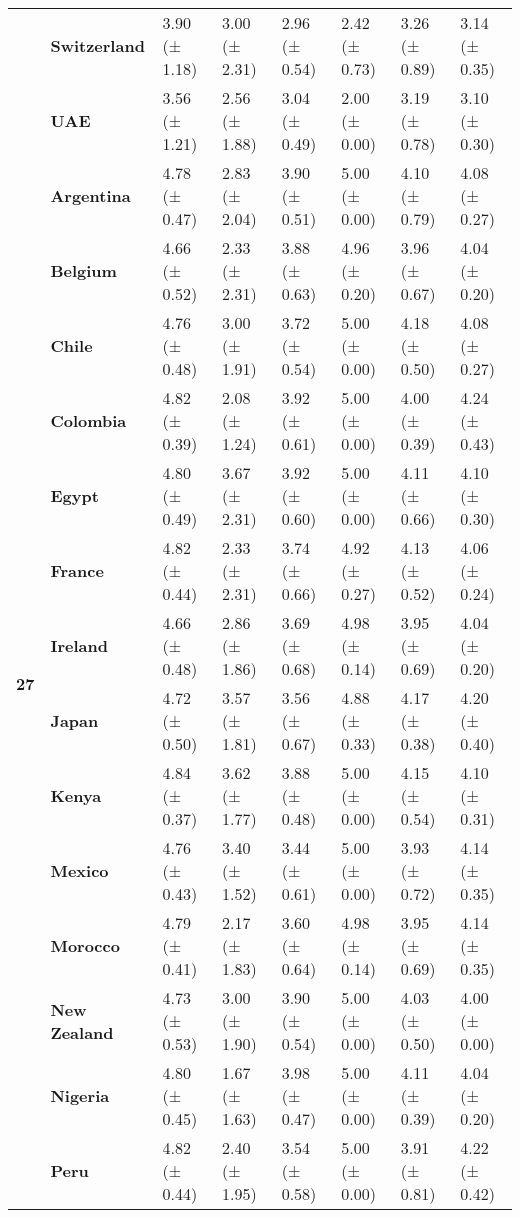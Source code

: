 \begin{longtable}{llllllll}
\textbf{} & \textbf{Switzerland} & 3.90 (± 1.18) & 3.00 (± 2.31) & 2.96 (± 0.54) & 2.42 (± 0.73) & 3.26 (± 0.89) & 3.14 (± 0.35) \\
\textbf{} & \textbf{UAE} & 3.56 (± 1.21) & 2.56 (± 1.88) & 3.04 (± 0.49) & 2.00 (± 0.00) & 3.19 (± 0.78) & 3.10 (± 0.30) \\
\cline{1-8}
\multirow[t]{19}{*}{\textbf{27}} & \textbf{Argentina} & 4.78 (± 0.47) & 2.83 (± 2.04) & 3.90 (± 0.51) & 5.00 (± 0.00) & 4.10 (± 0.79) & 4.08 (± 0.27) \\
\textbf{} & \textbf{Belgium} & 4.66 (± 0.52) & 2.33 (± 2.31) & 3.88 (± 0.63) & 4.96 (± 0.20) & 3.96 (± 0.67) & 4.04 (± 0.20) \\
\textbf{} & \textbf{Chile} & 4.76 (± 0.48) & 3.00 (± 1.91) & 3.72 (± 0.54) & 5.00 (± 0.00) & 4.18 (± 0.50) & 4.08 (± 0.27) \\
\textbf{} & \textbf{Colombia} & 4.82 (± 0.39) & 2.08 (± 1.24) & 3.92 (± 0.61) & 5.00 (± 0.00) & 4.00 (± 0.39) & 4.24 (± 0.43) \\
\textbf{} & \textbf{Egypt} & 4.80 (± 0.49) & 3.67 (± 2.31) & 3.92 (± 0.60) & 5.00 (± 0.00) & 4.11 (± 0.66) & 4.10 (± 0.30) \\
\textbf{} & \textbf{France} & 4.82 (± 0.44) & 2.33 (± 2.31) & 3.74 (± 0.66) & 4.92 (± 0.27) & 4.13 (± 0.52) & 4.06 (± 0.24) \\
\textbf{} & \textbf{Ireland} & 4.66 (± 0.48) & 2.86 (± 1.86) & 3.69 (± 0.68) & 4.98 (± 0.14) & 3.95 (± 0.69) & 4.04 (± 0.20) \\
\textbf{} & \textbf{Japan} & 4.72 (± 0.50) & 3.57 (± 1.81) & 3.56 (± 0.67) & 4.88 (± 0.33) & 4.17 (± 0.38) & 4.20 (± 0.40) \\
\textbf{} & \textbf{Kenya} & 4.84 (± 0.37) & 3.62 (± 1.77) & 3.88 (± 0.48) & 5.00 (± 0.00) & 4.15 (± 0.54) & 4.10 (± 0.31) \\
\textbf{} & \textbf{Mexico} & 4.76 (± 0.43) & 3.40 (± 1.52) & 3.44 (± 0.61) & 5.00 (± 0.00) & 3.93 (± 0.72) & 4.14 (± 0.35) \\
\textbf{} & \textbf{Morocco} & 4.79 (± 0.41) & 2.17 (± 1.83) & 3.60 (± 0.64) & 4.98 (± 0.14) & 3.95 (± 0.69) & 4.14 (± 0.35) \\
\textbf{} & \textbf{New Zealand} & 4.73 (± 0.53) & 3.00 (± 1.90) & 3.90 (± 0.54) & 5.00 (± 0.00) & 4.03 (± 0.50) & 4.00 (± 0.00) \\
\textbf{} & \textbf{Nigeria} & 4.80 (± 0.45) & 1.67 (± 1.63) & 3.98 (± 0.47) & 5.00 (± 0.00) & 4.11 (± 0.39) & 4.04 (± 0.20) \\
\textbf{} & \textbf{Peru} & 4.82 (± 0.44) & 2.40 (± 1.95) & 3.54 (± 0.58) & 5.00 (± 0.00) & 3.91 (± 0.81) & 4.22 (± 0.42) \\

\end{longtable}
